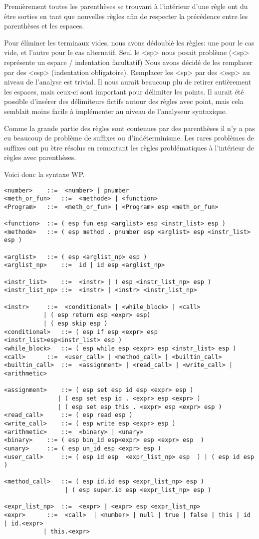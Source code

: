 Premièrement toutes les parenthèses se trouvant à l'intérieur d'une rêgle ont du être sorties en
tant que nouvelles règles afin de respecter la précédence entre les parenthèses et les espaces.  

Pour élíminer les terminaux vides, nous avons dédoublé les règles: une pour le cas vide, et l'autre
pour le cas alternatif. Seul le <sp> nous posait problème (<sp> représente un espace / indentation facultatif)
Nous avons décidé de les remplacer par des <esp> (indentation obligatoire). Remplacer les <sp> par des <esp> au
niveau de l'analyse est trivial. Il nous aurait beaucoup plu de retirer entièrement les espaces, mais ceux-ci
sont important pour délimiter les points. Il aurait été possible d'insérer des délimiteurs fictifs autour
des règles avec point, mais cela semblait moins facile à implémenter au niveau de l'analyseur syntaxique. 

Comme la grande partie des règles sont contenues par des parenthèses il n'y a pas eu beaucoup de problème de suffixes
ou d'indéterminisme. Les rares problèmes de suffixes ont pu ètre résolus en remontant les règles problématiques
à l'intérieur de règles avec parenthèses. 

Voici donc la syntaxe WP. 
\begin{verbatim}
<number>	::=  <number> | pnumber		
<meth_or_fun> 	::=  <methode> | <function>
<Program> 	::=  <meth_or_fun> | <Program> esp <meth_or_fun>

<function> 	::= ( esp fun esp <arglist> esp <instr_list> esp ) 
<methode> 	::= ( esp method . pnumber esp <arglist> esp <instr_list> esp ) 

<arglist>	::= ( esp <arglist_np> esp )
<arglist_np> 	::=  id | id esp <arglist_np>

<instr_list> 	::=  <instr> | ( esp <instr_list_np> esp ) 
<instr_list_np> ::=  <instr> | <instr> <instr_list_np>

<instr> 	::=  <conditional> | <while_block> | <call> 
           | ( esp return esp <expr> esp) 
           | ( esp skip esp )
<conditional> 	::= ( esp if esp <expr> esp <instr_list>esp<instr_list> esp ) 
<while_block> 	::= ( esp while esp <expr> esp <instr_list> esp ) 
<call> 		::=  <user_call> | <method_call> | <builtin_call> 
<builtin_call> 	::=  <assignment> | <read_call> | <write_call> | <arithmetic>

<assignment> 	::= ( esp set esp id esp <expr> esp ) 
               | ( esp set esp id . <expr> esp <expr> ) 
               | ( esp set esp this . <expr> esp <expr> esp )
<read_call>  	::= ( esp read esp ) 
<write_call> 	::= ( esp write esp <expr> esp )
<arithmetic> 	::=  <binary> | <unary>
<binary> 	::= ( esp bin_id esp<expr> esp <expr> esp  )
<unary>  	::= ( esp un_id esp <expr> esp )
<user_call>  	::= ( esp id esp  <expr_list_np> esp  ) | ( esp id esp ) 

<method_call>  	::= ( esp id.id esp <expr_list_np> esp ) 
                 | ( esp super.id esp <expr_list_np> esp ) 

<expr_list_np> 	::=  <expr> | <expr> esp <expr_list_np>
<expr> 		::=  <call>  | <number> | null | true | false | this | id | id.<expr> 
           | this.<expr>
\end{verbatim}
